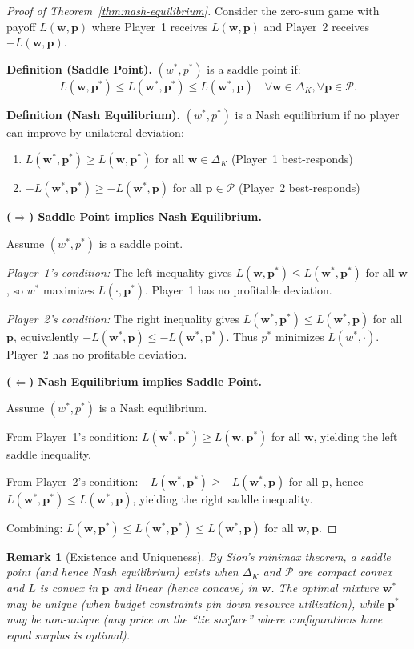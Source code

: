 \documentclass[11pt]{article}
\newtheorem{remark}{Remark}
\newcommand{\bp}{\mathbf{p}}
\newcommand{\bw}{\mathbf{w}}
\newcommand{\cP}{\mathcal{P}}
\begin{document}
\begin{proof}[Proof of Theorem~\ref{thm:nash-equilibrium}]
Consider the zero-sum game with payoff $L(\bw, \bp)$ where Player~1 receives $L(\bw, \bp)$ and Player~2 receives $-L(\bw, \bp)$.

\textbf{Definition (Saddle Point).} $(w^*, p^*)$ is a saddle point if:
\[
L(\bw, \bp^*) \le L(\bw^*, \bp^*) \le L(\bw^*, \bp) \quad \forall \bw \in \Delta_K, \forall \bp \in \cP.
\]

\textbf{Definition (Nash Equilibrium).} $(w^*, p^*)$ is a Nash equilibrium if no player can improve by unilateral deviation:
\begin{enumerate}
    \item $L(\bw^*, \bp^*) \ge L(\bw, \bp^*)$ for all $\bw \in \Delta_K$ (Player~1 best-responds)
    \item $-L(\bw^*, \bp^*) \ge -L(\bw^*, \bp)$ for all $\bp \in \cP$ (Player~2 best-responds)
\end{enumerate}

\textbf{($\Rightarrow$) Saddle Point implies Nash Equilibrium.}

Assume $(w^*, p^*)$ is a saddle point.

\emph{Player~1's condition:} The left inequality gives $L(\bw, \bp^*) \le L(\bw^*, \bp^*)$ for all $\bw$, so $w^*$ maximizes $L(\cdot, \bp^*)$. Player~1 has no profitable deviation.

\emph{Player~2's condition:} The right inequality gives $L(\bw^*, \bp^*) \le L(\bw^*, \bp)$ for all $\bp$, equivalently $-L(\bw^*, \bp) \le -L(\bw^*, \bp^*)$. Thus $p^*$ minimizes $L(w^*, \cdot)$. Player~2 has no profitable deviation.

\textbf{($\Leftarrow$) Nash Equilibrium implies Saddle Point.}

Assume $(w^*, p^*)$ is a Nash equilibrium.

From Player~1's condition: $L(\bw^*, \bp^*) \ge L(\bw, \bp^*)$ for all $\bw$, yielding the left saddle inequality.

From Player~2's condition: $-L(\bw^*, \bp^*) \ge -L(\bw^*, \bp)$ for all $\bp$, hence $L(\bw^*, \bp^*) \le L(\bw^*, \bp)$, yielding the right saddle inequality.

Combining: $L(\bw, \bp^*) \le L(\bw^*, \bp^*) \le L(\bw^*, \bp)$ for all $\bw, \bp$.
\end{proof}

\begin{remark}[Existence and Uniqueness]
By Sion's minimax theorem, a saddle point (and hence Nash equilibrium) exists when $\Delta_K$ and $\cP$ are compact convex and $L$ is convex in $\bp$ and linear (hence concave) in $\bw$. The optimal mixture $\bw^*$ may be unique (when budget constraints pin down resource utilization), while $\bp^*$ may be non-unique (any price on the ``tie surface'' where configurations have equal surplus is optimal).
\end{remark}
\end{document}
